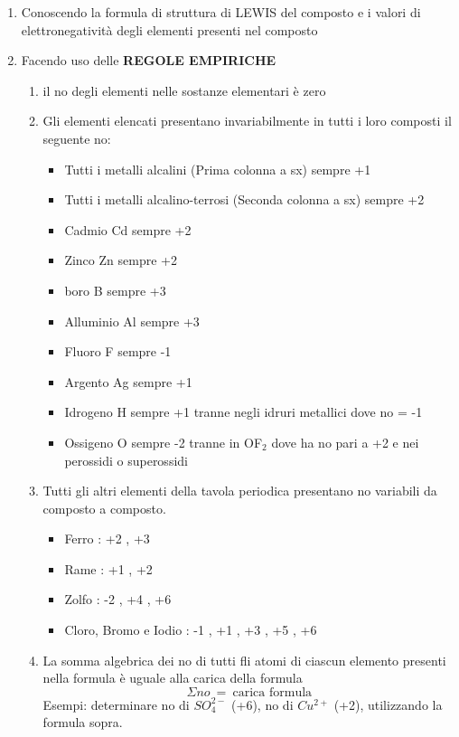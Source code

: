 \documentclass{article}
\begin{document}
\begin{enumerate}
    \item Conoscendo la formula di struttura di LEWIS del composto e i valori di elettronegatività degli elementi presenti nel composto
    \item Facendo uso delle \textbf{REGOLE EMPIRICHE}
    \begin{enumerate}
        \item il no degli elementi nelle sostanze elementari è zero
        \item Gli elementi elencati presentano invariabilmente in tutti i loro composti il seguente no:
        \begin{itemize}
            \item Tutti i metalli alcalini (Prima colonna a sx) sempre +1
            \item Tutti i metalli alcalino-terrosi (Seconda colonna a sx) sempre +2
            \item Cadmio Cd sempre +2
            \item Zinco Zn sempre +2
            \item boro B sempre +3
            \item Alluminio Al sempre +3
            \item Fluoro F sempre -1
            \item Argento Ag sempre +1
            \item Idrogeno H sempre +1 tranne negli idruri metallici dove no = -1
            \item Ossigeno O sempre -2 tranne in OF$_2$ dove ha no pari a +2 e nei perossidi o superossidi
        \end{itemize}
        \item Tutti gli altri elementi della tavola periodica presentano no variabili da composto a composto.
        \begin{itemize}
            \item Ferro : +2 , +3
            \item Rame : +1 , +2
            \item Zolfo : -2 , +4 , +6
            \item Cloro, Bromo e Iodio : -1 , +1 , +3 , +5 , +6
        \end{itemize}
        \item La somma algebrica dei no di tutti fli atomi di ciascun elemento presenti nella formula è uguale alla carica della formula
        \[\Sigma no \ = \ \text{carica formula}\]
        Esempi: determinare no di $SO_4^{2-}$ (+6), no di $Cu^{2+}$ (+2), utilizzando la formula sopra.\\
    \end{enumerate}
\end{enumerate}
\end{document}
